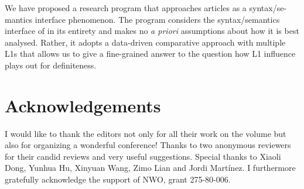 \documentclass[output=paper,
modfonts
]{langscibook}
\begin{document}
We have proposed a research program that approaches articles as a syntax/se\hyp{}mantics interface phenomenon. The program considers the syntax/semantics interface of  in its entirety and makes no \textit{a priori} assumptions about how it is best analysed. Rather, it adopts a data-driven comparative approach with multiple L1s that allows us to give a fine-grained answer to the question how L1 influence plays out for definiteness.

\section*{Acknowledgements}
I would like to thank the editors not only for all their work on the
volume but also for organizing a wonderful conference! Thanks to two
anonymous reviewers for their candid reviews and very useful
suggestions. Special thanks to Xiaoli Dong, Yunhua Hu, Xinyuan Wang,
Zimo Lian and Jordi Martínez. I furthermore gratefully acknowledge the
support of NWO, grant 275-80-006.

{\sloppy
\printbibliography[heading=subbibliography,notkeyword=this]}
\end{document}

